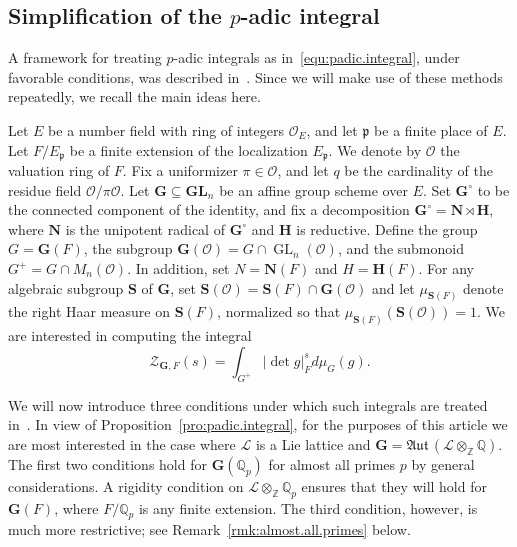 \documentclass[11pt,a4paper]{amsart}
\theoremstyle{plain}
\theoremstyle{remark}
\newcommand{\Z}{\mathbb{Z}}
\newcommand{\Q}{\mathbb{Q}}
\newcommand{\tensor}{\otimes}
\newcommand{\p}{\mathfrak{p}}
\DeclareMathOperator{\GL}{GL}
\def \aAut {\mathfrak{Aut} \,}
\def \p {\ensuremath{\mathfrak{p}}}
\begin{document}
\subsection{Simplification of the $p$-adic integral} \label{sec:assumptions}
A framework for treating $p$-adic integrals as in~\eqref{equ:padic.integral}, under favorable conditions, was described in~\cite[\S2]{duSLubotzky/96}.  Since we will make use of these methods repeatedly, we recall the main ideas here.  

Let $E$ be a number field with ring of integers $\mathcal{O}_E$, and let $\mathfrak{p}$ be a finite place of $E$.  Let $F/E_{\p}$ be a finite extension of the localization $E_{\p}$.  We denote by $\mathcal{O}$ the valuation ring of $F$.  Fix a uniformizer $\pi \in \mathcal{O}$, and let $q$ be the cardinality of the residue field $\mathcal{O} / \pi \mathcal{O}$.  
Let $\mathbf{G} \subseteq \mathbf{GL}_n$ be an affine group scheme over $E$.  Set $\mathbf{G}^\circ$ to be the connected component of the identity, and fix a decomposition $\mathbf{G}^\circ = \mathbf{N} \rtimes \mathbf{H}$, where $\mathbf{N}$ is the unipotent radical of $\mathbf{G}^\circ$ and $\mathbf{H}$ is reductive.  Define the group $G = \mathbf{G}(F)$, the subgroup $\mathbf{G}(\mathcal{O}) = G \cap \GL_n(\mathcal{O})$, and the submonoid $G^+ = G \cap M_n (\mathcal{O})$.  In addition, set $N = \mathbf{N}(F)$ and $H = \mathbf{H}(F)$.  
For any algebraic subgroup $\mathbf{S}$ of $\mathbf{G}$, set $\mathbf{S}(\mathcal{O}) = \mathbf{S}(F) \cap \mathbf{G}(\mathcal{O})$ and let $\mu_{\mathbf{S}(F)}$ denote the right Haar measure on $\mathbf{S}(F)$, normalized so that $\mu_{\mathbf{S}(F)}(\mathbf{S}(\mathcal{O})) = 1$.
We are interested in computing the integral
\begin{equation} \label{equ:padic.integral.discussion}
\mathcal{Z}_{\mathbf{G}, F} (s) = \int_{G^+} | \det g |_{F}^s d \mu_G (g).
\end{equation}


We will now introduce three conditions under which such integrals are treated in~\cite[\S2]{duSLubotzky/96}.  
In view of Proposition~\ref{pro:padic.integral}, for the purposes of this article we are most interested in the case where $\mathcal{L}$ is a Lie lattice and $\mathbf{G} = \aAut (\mathcal{L} \tensor_\Z \Q)$.  
The first two conditions hold for $\mathbf{G}(\Q_p)$ for almost all primes $p$ by general considerations.
A rigidity condition on $\mathcal{L} \tensor_\Z \Q_p$ ensures that they will hold for $\mathbf{G}(F)$, where $F/\Q_p$ is any finite extension.  The third condition, however, is much more restrictive; see Remark~\ref{rmk:almost.all.primes} below.
\end{document}
